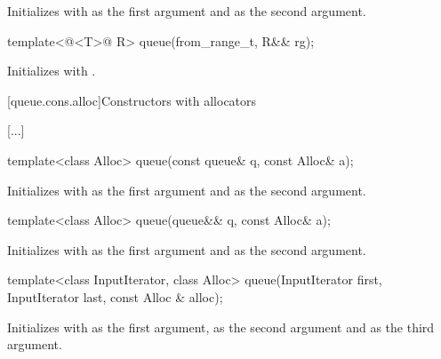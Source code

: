 \documentclass{wg21}
\begin{document}
\begin{itemdescr}
    \pnum
    \effects
    Initializes  with  as the first argument and  as the second argument.
\end{itemdescr}

\begin{addedblock}
\begin{itemdecl}
    template<@<T>@ R>
    queue(from_range_t, R&& rg);
\end{itemdecl}

\begin{itemdescr}
    \pnum
    \effects
    Initializes  with .
\end{itemdescr}
\end{addedblock}

[queue.cons.alloc]{Constructors with allocators}

[...]

\begin{itemdecl}
    template<class Alloc> queue(const queue& q, const Alloc& a);
\end{itemdecl}

\begin{itemdescr}
    \pnum
    \effects
    Initializes  with  as the first argument and  as the
    second argument.
\end{itemdescr}

\begin{itemdecl}
    template<class Alloc> queue(queue&& q, const Alloc& a);
\end{itemdecl}

\begin{itemdescr}
    \pnum
    \effects
    Initializes  with  as the first argument and 
    as the second argument.
\end{itemdescr}

\begin{itemdecl}
    template<class InputIterator, class Alloc>
    queue(InputIterator first, InputIterator last, const Alloc & alloc);
\end{itemdecl}

\begin{itemdescr}
    \pnum
    \effects
    Initializes  with  as the first argument,  as the second argument and  as the third argument.
\end{itemdescr}
\end{document}
